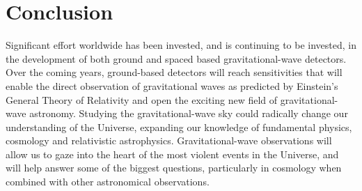 \section{Conclusion}
\label{section:conclusion} 

Significant effort worldwide has been invested, and is continuing to be
invested, in the development of both ground and spaced based gravitational-wave
detectors. Over the coming years, ground-based detectors will reach
sensitivities that will enable the direct observation of gravitational waves as
predicted by Einstein's General Theory of Relativity and open the exciting new
field of gravitational-wave astronomy. Studying the gravitational-wave
sky could radically change our understanding of the Universe, expanding our
knowledge of fundamental physics, cosmology and relativistic astrophysics.
Gravitational-wave observations will allow us to gaze into the heart of the most
violent events in the Universe, and will help answer some of the biggest
questions, particularly in cosmology when combined with other astronomical
observations.


\bigskip